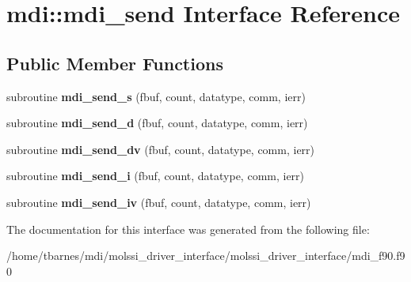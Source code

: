 \hypertarget{interfacemdi_1_1mdi__send}{\section{mdi\-:\-:mdi\-\_\-send Interface Reference}
\label{interfacemdi_1_1mdi__send}
}
\subsection*{Public Member Functions}
\begin{DoxyCompactItemize}
\item 
\hypertarget{interfacemdi_1_1mdi__send_abd109b0b0e0b3f95e9782cf01d8ab7bb}{subroutine {\bfseries mdi\-\_\-send\-\_\-s} (fbuf, count, datatype, comm, ierr)}\label{interfacemdi_1_1mdi__send_abd109b0b0e0b3f95e9782cf01d8ab7bb}

\item 
\hypertarget{interfacemdi_1_1mdi__send_a609eb3114aba823f801636fc4013165c}{subroutine {\bfseries mdi\-\_\-send\-\_\-d} (fbuf, count, datatype, comm, ierr)}\label{interfacemdi_1_1mdi__send_a609eb3114aba823f801636fc4013165c}

\item 
\hypertarget{interfacemdi_1_1mdi__send_a891088c993f8f958c97ab01f4a504a42}{subroutine {\bfseries mdi\-\_\-send\-\_\-dv} (fbuf, count, datatype, comm, ierr)}\label{interfacemdi_1_1mdi__send_a891088c993f8f958c97ab01f4a504a42}

\item 
\hypertarget{interfacemdi_1_1mdi__send_ab11c98611174127b27f723aef2055f64}{subroutine {\bfseries mdi\-\_\-send\-\_\-i} (fbuf, count, datatype, comm, ierr)}\label{interfacemdi_1_1mdi__send_ab11c98611174127b27f723aef2055f64}

\item 
\hypertarget{interfacemdi_1_1mdi__send_a2890417bf9b36440044e97ddfb3a448c}{subroutine {\bfseries mdi\-\_\-send\-\_\-iv} (fbuf, count, datatype, comm, ierr)}\label{interfacemdi_1_1mdi__send_a2890417bf9b36440044e97ddfb3a448c}

\end{DoxyCompactItemize}


The documentation for this interface was generated from the following file\-:\begin{DoxyCompactItemize}
\item 
/home/tbarnes/mdi/molssi\-\_\-driver\-\_\-interface/molssi\-\_\-driver\-\_\-interface/mdi\-\_\-f90.\-f90\end{DoxyCompactItemize}
